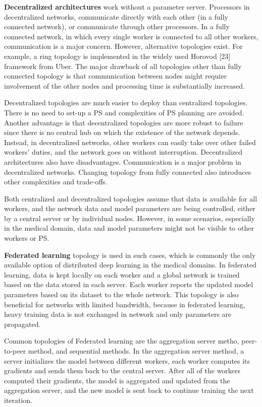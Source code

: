 \textbf{Decentralized architectures} work without a parameter server. Processors in decentralized networks, communicate directly with each other (in a fully connected network), or communicate through other processors. In a fully connected network, in which every single worker is connected to all other workers, communication is a major concern. However, alternative topologies exist. For example, a ring topology is implemented in the widely used Horovod [23] framework from Uber.  The major drawback of all topologies other than fully connected topology is that communication between nodes might require involvement of the other nodes and processing time is substantially increased. 


Decentralized topologies are much easier to deploy than centralized topologies. There is no need to set-up a PS and complexities of PS planning are avoided. Another advantage is that decentralized topologies are more robust to failure since there is no central hub on which the existence of the network depends. Instead, in decentralized networks, other workers can easily take over other failed workers' duties, and the network goes on without interruption. Decentralized architectures also have disadvantages. Communication is a major problem in decentralized networks. Changing topology from fully connected also introduces other complexities and trade-offs.


Both centralized and decentralized topologies assume that data is available for all workers, and the network data and model parameters are being controlled, either by a central server or by individual nodes. However, in some scenarios, especially in the medical domain, data and model parameters might not be visible to other workers or PS. 


\textbf{Federated learning} topology is used in such cases, which is commonly the only available option of distributed deep learning in the medical domains. In federated learning, data is kept locally on each worker and a global network is trained based on the data stored in each server. Each worker reports the updated model parameters based on its dataset to the whole network. This topology is also beneficial for networks with limited bandwidth, because in federated learning, heavy training data is not exchanged in network and only parameters are propagated.


Common topologies of Federated learning are the aggregation server metho, peer-to-peer method, and sequential methods.
In the aggregation server method, a server initializes the model between different workers, each worker computes its gradients and sends them back to the central server. After all of the workers computed their gradients, the model is aggregated and updated from the aggregation server, and the new model is sent back to continue training the next iteration.


